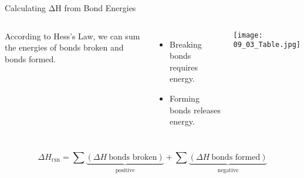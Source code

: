 \documentclass[handout]{beamer}
\begin{document}
\begin{frame}{Calculating ΔH from Bond Energies}
	\begin{columns}
		According to Hess's Law, we can \alert{sum} the energies of bonds
		broken and bonds formed.
		\begin{itemize}
			\item \alert{Breaking} bonds \alert{requires} energy.
			\item \alert{Forming} bonds \alert{releases} energy.
		\end{itemize}
		\begin{center}
			\texttt{[image: 09\_03\_Table.jpg]}
		\end{center}
	\end{columns}

	\pause

	\begin{equation*} \Delta H_\text{rxn} = \sum \underbrace{(\Delta H~\text{bonds
		broken})}_\text{positive} +
		\sum \underbrace{(\Delta H~\text{bonds formed})}_\text{negative}
	\end{equation*}
\end{frame}
\end{document}
